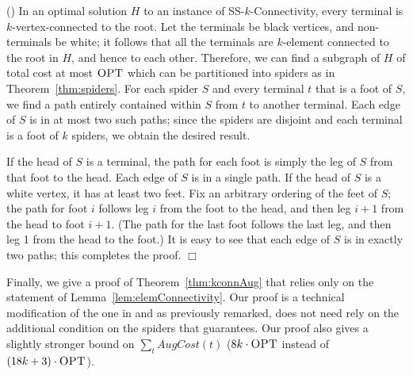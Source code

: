 \documentclass[11pt]{article}
\newcommand{\opt}{\text{\sc OPT}}
\newcommand{\sskconn}{{\sc SS-$k$-Connectivity}}
\newenvironment{proofof}[1]{\smallskip\noindent{\bf Proof of #1:}}{\hspace*{\fill}$\Box$\par}
\begin{document}
\begin{proofof}{Lemma~\ref{lem:elemConnectivity}}(\cite{ChuzhoyK08})
  In an optimal solution $H$ to an instance of \sskconn, every
  terminal is $k$-vertex-connected to the root. Let the terminals be
  black vertices, and non-terminals be white; it follows that all the
  terminals are $k$-element connected to the root in $H$, and hence to
  each other. Therefore, we can find a subgraph of $H$ of total cost
  at most $\opt$ which can be partitioned into spiders as in
  Theorem~\ref{thm:spiders}. For each spider $S$ and every terminal
  $t$ that is a foot of $S$, we find a path entirely contained within
  $S$ from $t$ to another terminal. Each edge of $S$ is in at most two
  such paths; since the spiders are disjoint and each terminal is a
  foot of $k$ spiders, we obtain the desired result.

  If the head of $S$ is a terminal, the path for each foot is simply
  the leg of $S$ from that foot to the head. Each edge of $S$ is in a
  single path. If the head of $S$ is a white vertex, it has at least
  two feet. Fix an arbitrary ordering of the feet of $S$; the path for
  foot $i$ follows leg $i$ from the foot to the head, and then leg
  $i+1$ from the head to foot $i+1$. (The path for the last foot
  follows the last leg, and then leg 1 from the head to the foot.)
  It is easy to see that each edge of $S$ is in exactly two paths;
  this completes the proof.
\end{proofof}

Finally, we give a proof of Theorem~\ref{thm:kconnAug} that relies
only on the statement of Lemma~\ref{lem:elemConnectivity}. Our
proof is a technical modification of the one in \cite{ChuzhoyK08} and
as previously remarked, does not need rely on the additional condition
on the spiders that \cite{ChuzhoyK08} guarantees. Our proof
also gives a slightly stronger bound on $\sum_t AugCost(t)$ ($8k \cdot
\opt$ instead of $(18 k + 3)\cdot \opt$).
\end{document}
